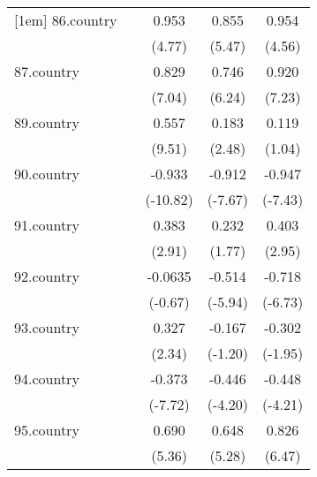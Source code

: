 {\begin{tabular}{l*{4}{c}}
[1em]
86.country  &                     &       0.953\sym{***}&       0.855\sym{***}&       0.954\sym{***}\\
            &                     &      (4.77)         &      (5.47)         &      (4.56)         \\
[1em]
87.country  &                     &       0.829\sym{***}&       0.746\sym{***}&       0.920\sym{***}\\
            &                     &      (7.04)         &      (6.24)         &      (7.23)         \\
[1em]
89.country  &                     &       0.557\sym{***}&       0.183\sym{*}  &       0.119         \\
            &                     &      (9.51)         &      (2.48)         &      (1.04)         \\
[1em]
90.country  &                     &      -0.933\sym{***}&      -0.912\sym{***}&      -0.947\sym{***}\\
            &                     &    (-10.82)         &     (-7.67)         &     (-7.43)         \\
[1em]
91.country  &                     &       0.383\sym{**} &       0.232         &       0.403\sym{**} \\
            &                     &      (2.91)         &      (1.77)         &      (2.95)         \\
[1em]
92.country  &                     &     -0.0635         &      -0.514\sym{***}&      -0.718\sym{***}\\
            &                     &     (-0.67)         &     (-5.94)         &     (-6.73)         \\
[1em]
93.country  &                     &       0.327\sym{*}  &      -0.167         &      -0.302         \\
            &                     &      (2.34)         &     (-1.20)         &     (-1.95)         \\
[1em]
94.country  &                     &      -0.373\sym{***}&      -0.446\sym{***}&      -0.448\sym{***}\\
            &                     &     (-7.72)         &     (-4.20)         &     (-4.21)         \\
[1em]
95.country  &                     &       0.690\sym{***}&       0.648\sym{***}&       0.826\sym{***}\\
            &                     &      (5.36)         &      (5.28)         &      (6.47)         \\

\end{tabular}}
